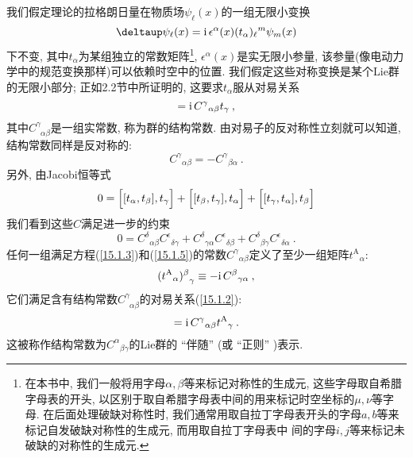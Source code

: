 我们假定理论的拉格朗日量在物质场$\psi _{\ell }(x)$的一组无限小变换
\begin{equation}
\deltaup \psi _{\ell }(x)=\mi\,\epsilon ^{\alpha }(x)(t_{\alpha })_{\ell }{}^{m}\psi _{m}(x)  \label{15.1.1}
\end{equation}%
下不变, 其中$t_{\alpha }$为某组独立的常数矩阵\footnote{%
在本书中, 我们一般将用字母$\alpha ,\beta $等来标记对称性的生成元, 这些字母取自希腊字母表的开头, 
以区别于取自希腊字母表中间的用来标记时空坐标的$\mu ,\nu $等字母. 在后面处理破缺对称性时, 
我们通常用取自拉丁字母表开头的字母$a,b$等来标记自发破缺对称性的生成元, 而用取自拉丁字母表中%
间的字母$i,j$等来标记未破缺的对称性的生成元.}, 
$\epsilon ^{\alpha}(x)$是实无限小参量, 该参量(像电动力学中的规范变换那样)可以依赖时空中的位置. 
我们假定这些对称变换是某个Lie群的无限小部分; 正如2.2节中所证明的, 这要求$t_{\alpha}$服从对易关系
\begin{equation}
[ t_{\alpha },t_{\beta }]=\mi\, C^{\gamma}{}_{\alpha \beta }t_{\gamma}\:,  \label{15.1.2}
\end{equation}%
其中$C_{\phantom{\gamma}\alpha \beta }^{\gamma }$是一组实常数, 称为群的结构常数. 
由对易子的反对称性立刻就可以知道, 结构常数同样是反对称的:%
\begin{equation}
C^{\gamma}{}_{\alpha\beta}=-C^{\gamma}{}_{\beta\alpha} \:. \label{15.1.3}
\end{equation}%
另外, 由Jacobi恒等式
\begin{equation}
0=\Bigl[ [t_{\alpha},t_{\beta}],t_{\gamma}\Bigr] + \Bigl[ [t_{\beta},t_{\gamma }],t_{\alpha }\Bigr] 
+\Bigl[ [t_{\gamma },t_{\alpha }],t_{\beta}\Bigr]  \label{15.1.4}
\end{equation}%
我们看到这些$C$满足进一步的约束
\begin{equation}
0=C^{\delta }{}_{\alpha \beta }C^{\epsilon}{}_{\delta\gamma}
+C^{\delta}{}_{\gamma \alpha}C^{\epsilon}{}_{\delta \beta }
+C^{\delta }{}_{\beta \gamma}C^{\epsilon }{}_{\delta \alpha}  \:. \label{15.1.5}
\end{equation}%
任何一组满足方程(\ref{15.1.3})和(\ref{15.1.5})的常数${C^{\gamma}}_{\alpha\beta}$定义了至少一组矩阵${t^{\text{A}}}_{\alpha}$:%
\begin{equation}
{({t^{\text{A}}}_{\alpha})^{\beta}}_{\gamma }\equiv -\mathrm{i}\,{C^{\beta }}_{\gamma \alpha } \:,
\label{15.1.6}
\end{equation}%
它们满足含有结构常数$C_{\phantom{\gamma}\alpha \beta }^{\gamma }$的对易关系(\ref{15.1.2}):%
\begin{equation}
[ {t^{\text{A}}}_{\alpha},{t^{\text{A}}}_{\beta}]=\mi\,C^{\gamma}{}_{\alpha \beta }{t^{\text{A}}}_{\gamma}\:.   \label{15.1.7}
\end{equation}%
这被称作结构常数为$C^{\alpha}{}_{ \beta\gamma }$的Lie群的 ``伴随'' (或 ``正则'' )表示.

